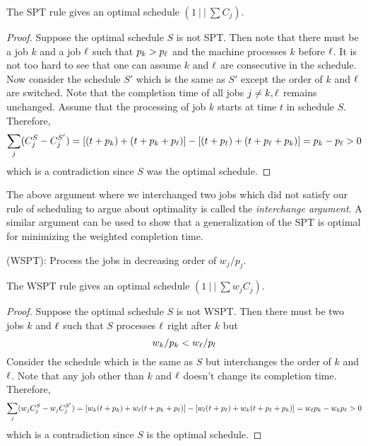 \documentclass[11pt]{article}
\begin{document}
\begin{theorem}
The SPT rule gives an optimal schedule $(1~|~|~ \sum C_j)$.
\end{theorem}
\begin{proof}
Suppose the optimal schedule $S$ is not SPT. Then note that there must be a job $k$ and a job $\ell$ such that $p_k > p_\ell$ and the machine processes $k$ 
before $\ell$. It is not too hard to see that one can assume $k$ and $\ell$ are consecutive in the schedule. Now consider the schedule $S'$ 
which is the same as $S'$ except the order of $k$ and $\ell$ are switched. Note that the completion time of all jobs $j\neq k,\ell$ remains unchanged.
Assume that the processing of job $k$ starts at time $t$ in schedule $S$.
Therefore, 
$$\sum_{j} (C^{S}_j - C^{S'}_j) = [(t+p_k) + (t+p_k+p_\ell)] - [(t+p_\ell) + (t+p_\ell+p_k)] = p_k - p_\ell > 0$$
which is a contradiction since $S$ was the optimal schedule.
\end{proof}

The above argument where we interchanged two jobs which did not satisfy our rule of scheduling to argue about optimality is called 
the {\em interchange argument}. A similar argument can be used to show that a generalization of the SPT is optimal for minimizing the 
weighted completion time.

\begin{definition}
(WSPT): Process the jobs in decreasing order of $w_j/p_j$.
\end{definition}

\begin{theorem}\label{thm:wspt}
The WSPT rule gives an optimal schedule $(1~|~|~ \sum w_jC_j)$.
\end{theorem}

\begin{proof}
Suppose the optimal schedule $S$ is not WSPT. Then there must be two jobs $k$ and $\ell$ such that $S$ processes $\ell$ right after $k$ but $$w_k/p_k < w_\ell/p_l$$
Consider the schedule which is the same as $S$ but interchanges the order of $k$ and $\ell$. Note that any job other than $k$ and $\ell$ doesn't change its completion time. Therefore,
$$\sum_{j} (w_jC^{S}_j - w_jC^{S'}_j) = [w_k(t+p_k) + w_\ell(t+p_k+p_\ell)] - [w_l(t+p_\ell) + w_k(t+p_\ell+p_k)] = w_\ell p_k - w_kp_\ell > 0$$
which is a contradiction since $S$ is the optimal schedule.
\end{proof}

\end{document}
